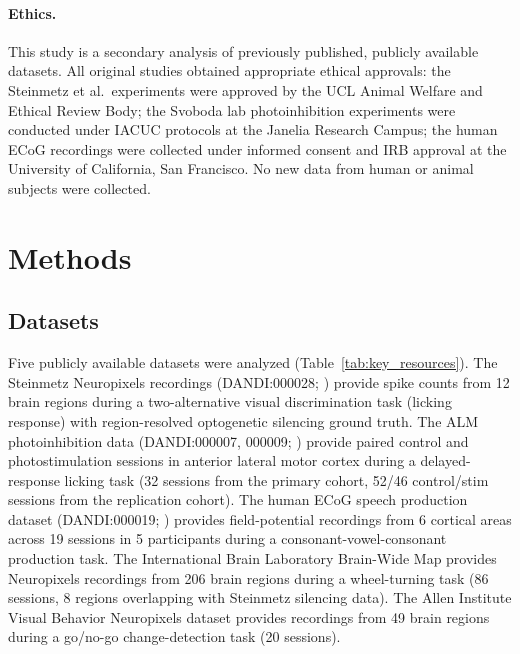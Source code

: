 \documentclass[9pt,lineno]{elife}
\begin{document}
\paragraph{Ethics.} This study is a secondary analysis of previously published, publicly available datasets. All original studies obtained appropriate ethical approvals: the Steinmetz et al.\ experiments were approved by the UCL Animal Welfare and Ethical Review Body; the Svoboda lab photoinhibition experiments were conducted under IACUC protocols at the Janelia Research Campus; the human ECoG recordings were collected under informed consent and IRB approval at the University of California, San Francisco. No new data from human or animal subjects were collected.


\section{Methods}

\subsection{Datasets}
\label{sec:datasets}

Five publicly available datasets were analyzed (Table~\ref{tab:key_resources}). The Steinmetz Neuropixels recordings (DANDI:000028; \citealp{steinmetz2019distributed, zatkahaas2021}) provide spike counts from 12 brain regions during a two-alternative visual discrimination task (licking response) with region-resolved optogenetic silencing ground truth. The ALM photoinhibition data (DANDI:000007, 000009; \citealp{svoboda_alm}) provide paired control and photostimulation sessions in anterior lateral motor cortex during a delayed-response licking task (32 sessions from the primary cohort, 52/46 control/stim sessions from the replication cohort). The human ECoG speech production dataset (DANDI:000019; \citealp{dandi000019}) provides field-potential recordings from 6 cortical areas across 19 sessions in 5 participants during a consonant-vowel-consonant production task. The International Brain Laboratory Brain-Wide Map \citep{ibl2025brainwide} provides Neuropixels recordings from 206 brain regions during a wheel-turning task (86 sessions, 8 regions overlapping with Steinmetz silencing data). The Allen Institute Visual Behavior Neuropixels dataset \citep{siegle2021survey} provides recordings from 49 brain regions during a go/no-go change-detection task (20 sessions).
\end{document}
